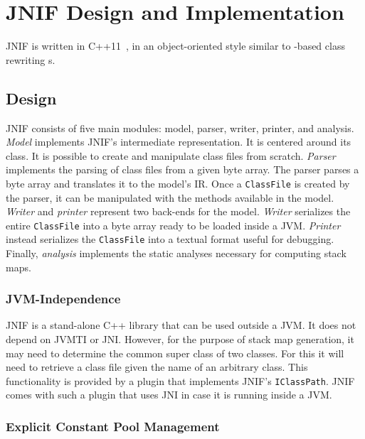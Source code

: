 \section{JNIF Design and Implementation}
\label{sec:jnif-implementation}

JNIF is written in C++11~\citep{ISO:2012:III}, 
in an object-oriented style similar to \java{}-based class rewriting \api{}s.

\subsection{Design}

JNIF consists of five main modules: model, parser, writer, printer, and analysis.
%
\emph{Model} implements JNIF's intermediate representation.
It is centered around its  class. 
It is possible to create and manipulate class files from scratch.
%
\emph{Parser} implements the parsing of class files from a given byte array.
The parser parses a byte array and translates it to the model's IR.
Once a \texttt{ClassFile} is created by the parser,
it can be manipulated with the methods available in the model.
%
\emph{Writer} and \emph{printer} represent two back-ends for the model.
%
\emph{Writer} serializes the entire \texttt{ClassFile} into a byte array ready to be loaded inside a JVM.
%
\emph{Printer} instead serializes the \texttt{ClassFile} into a textual format useful for debugging.
%
Finally, \emph{analysis} implements the static analyses necessary for computing stack maps.


\subsubsection*{JVM-Independence}

JNIF is a stand-alone C++ library that can be used outside a JVM.
It does not depend on JVMTI or JNI.
However, for the purpose of stack map generation,
it may need to determine the common super class of two classes.
For this it will need to retrieve a class file given the name of an arbitrary class. 
This functionality is provided by a plugin that implements JNIF's \texttt{IClassPath}.
JNIF comes with such a plugin that uses JNI in case it is running inside a JVM.


\subsubsection*{Explicit Constant Pool Management}

